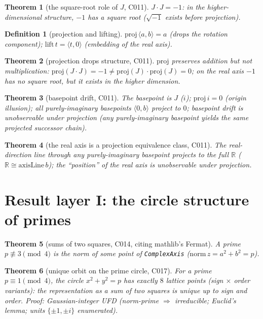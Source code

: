 \documentclass[11pt]{article}
\newtheorem{theorem}{Theorem}
\newtheorem{definition}{Definition}
\theoremstyle{remark}
\begin{document}
\begin{theorem}[the square-root role of $J$, C011]
\label{thm:jsq}
$J\cdot J=-1$: in the higher-dimensional structure, $-1$ has a square root
($\sqrt{-1}$ exists before projection).
\end{theorem}

\begin{definition}[projection and lifting]
\label{def:proj}
$\mathrm{proj}\,\langle a,b\rangle = a$ (drops the rotation component);
$\mathrm{lift}\,t = \langle t,0\rangle$ (embedding of the real axis).
\end{definition}

\begin{theorem}[projection drops structure, C011]
\label{thm:projdrops}
$\mathrm{proj}$ preserves addition but not multiplication:
$\mathrm{proj}(J\cdot J)=-1\neq \mathrm{proj}(J)\cdot\mathrm{proj}(J)=0$; on
the real axis $-1$ has no square root, but it exists in the higher dimension.
\end{theorem}

\begin{theorem}[basepoint drift, C011]
\label{thm:drift}
The basepoint is $J$ ($i$); $\mathrm{proj}\,i=0$ (origin illusion); all
purely-imaginary basepoints $\langle 0,b\rangle$ project to $0$; basepoint
drift is unobservable under projection (any purely-imaginary basepoint yields
the same projected successor chain).
\end{theorem}

\begin{theorem}[the real axis is a projection equivalence class, C011]
\label{thm:equivalence}
The real-direction line through any purely-imaginary basepoint projects to
the full $\mathbb{R}$ ($\mathbb{R}\cong \mathrm{axisLine}\,b$); the
``position'' of the real axis is unobservable under projection.
\end{theorem}

\section{Result layer I: the circle structure of primes}
\label{sec:layerI}

\begin{theorem}[sums of two squares, C014, citing mathlib's Fermat]
\label{thm:sumsquares}
A prime $p\not\equiv 3 \pmod 4$ is the norm of some point of
\texttt{ComplexAxis} ($\mathrm{norm}\,z=a^2+b^2=p$).
\end{theorem}

\begin{theorem}[unique orbit on the prime circle, C017]
\label{thm:orbit}
For a prime $p\equiv 1 \pmod 4$, the circle $x^2+y^2=p$ has exactly $8$
lattice points (sign $\times$ order variants): the representation as a sum of
two squares is unique up to sign and order. \emph{Proof:} Gaussian-integer UFD
(norm-prime $\Rightarrow$ irreducible; Euclid's lemma; units
$\{\pm 1,\pm i\}$ enumerated).
\end{theorem}
\end{document}
